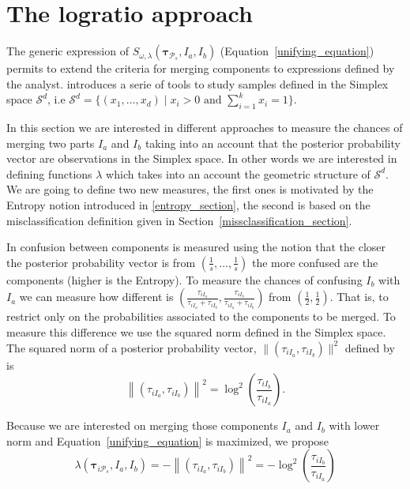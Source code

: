 \documentclass[submit]{smj}
\theoremstyle{definition}
\newcommand{\m}[1]{\boldsymbol{#1}}
\begin{document}
\section{The logratio approach}\label{logratio_section}

The generic expression of $S_{\omega, \lambda}( \m\tau_{\mathcal{P}_s},  I_a,  I_b)$ (Equation~\ref{unifying_equation}) permits to extend the criteria for merging components to expressions defined by the analyst. \cite{aitchison1986statistical} introduces a serie of tools to study samples defined in the Simplex space $\mathcal{S}^d$, i.e $\mathcal{S}^d = \{ (x_1,\dots, x_d) \;|\; x_i > 0 \text{ and } \sum_{i=1}^k x_i = 1 \}$. 

In this section we are interested in different approaches to measure the chances of merging two parts $I_a$ and $I_b$ taking into an account that the posterior probability vector are observations in the Simplex space. In other words we are interested in defining functions $\lambda$ which takes into an account the geometric structure of $\mathcal{S}^d$. We are going to define two new measures, the first ones is motivated by the Entropy notion introduced in \ref{entropy_section}, the second is based on the misclassification definition given in Section~\ref{missclassification_section}.


In \cite{baudry2010combining} confusion between components is measured using the notion that the closer the posterior probability vector is from $(\frac{1}{s}, \dots, \frac{1}{s})$ the more confused are the components (higher is the Entropy). To measure the chances of confusing $I_b$ with $I_a$ we can measure how different is $(\frac{\tau_{i I_a}}{\tau_{i I_a} +\tau_{i I_b}}, \frac{\tau_{i I_b}}{\tau_{i I_a} + \tau_{i I_b}})$ from $(\frac{1}{2}, \frac{1}{2})$. That is, to restrict only on the probabilities associated to the components to be merged. To measure this difference we use the squared norm defined in the Simplex space. The squared norm of a posterior probability vector, $\| (\tau_{iI_a}, \tau_{iI_b}) \|^2$  defined by \cite{aitchison2002simplicial} is 
\[
\left\| (\tau_{iI_a}, \tau_{iI_b}) \right\|^2 = \log^2 \left(\frac{ \tau_{iI_b} }{ \tau_{iI_a} }\right).
\]

Because we are interested on merging those components $I_a$ and $I_b$ with lower norm and Equation~\ref{unifying_equation} is maximized, we propose
\[
\lambda(\m\tau_{i \mathcal{P}_s},  I_a,  I_b) = -\left\| (\tau_{iI_a}, \tau_{iI_b}) \right\|^2 = -\log^2 \left(\frac{ \tau_{iI_b} }{ \tau_{iI_a} }\right)
\]
\end{document}
